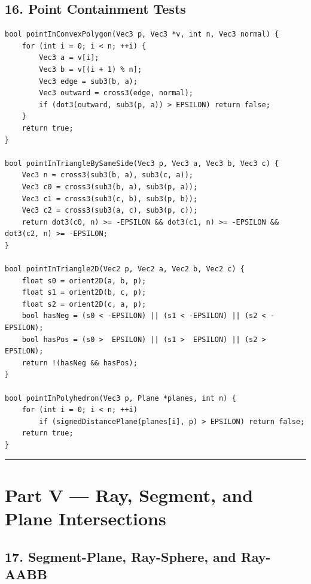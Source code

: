 \documentclass[10pt,letterpaper]{article}
\begin{document}
\subsection*{16. Point Containment Tests}

\begin{verbatim}
bool pointInConvexPolygon(Vec3 p, Vec3 *v, int n, Vec3 normal) {
    for (int i = 0; i < n; ++i) {
        Vec3 a = v[i];
        Vec3 b = v[(i + 1) % n];
        Vec3 edge = sub3(b, a);
        Vec3 outward = cross3(edge, normal);
        if (dot3(outward, sub3(p, a)) > EPSILON) return false;
    }
    return true;
}

bool pointInTriangleBySameSide(Vec3 p, Vec3 a, Vec3 b, Vec3 c) {
    Vec3 n = cross3(sub3(b, a), sub3(c, a));
    Vec3 c0 = cross3(sub3(b, a), sub3(p, a));
    Vec3 c1 = cross3(sub3(c, b), sub3(p, b));
    Vec3 c2 = cross3(sub3(a, c), sub3(p, c));
    return dot3(c0, n) >= -EPSILON && dot3(c1, n) >= -EPSILON && dot3(c2, n) >= -EPSILON;
}

bool pointInTriangle2D(Vec2 p, Vec2 a, Vec2 b, Vec2 c) {
    float s0 = orient2D(a, b, p);
    float s1 = orient2D(b, c, p);
    float s2 = orient2D(c, a, p);
    bool hasNeg = (s0 < -EPSILON) || (s1 < -EPSILON) || (s2 < -EPSILON);
    bool hasPos = (s0 >  EPSILON) || (s1 >  EPSILON) || (s2 >  EPSILON);
    return !(hasNeg && hasPos);
}

bool pointInPolyhedron(Vec3 p, Plane *planes, int n) {
    for (int i = 0; i < n; ++i)
        if (signedDistancePlane(planes[i], p) > EPSILON) return false;
    return true;
}
\end{verbatim}

\medskip\hrule\medskip


\clearpage
{}
\section*{Part V --- Ray, Segment, and Plane Intersections}


\subsection*{17. Segment-Plane, Ray-Sphere, and Ray-AABB}
\end{document}
